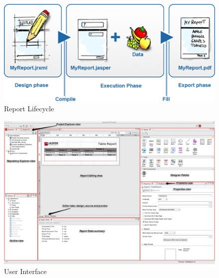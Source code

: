 \begin{figure}[!ht]
        \centering\includegraphics[width=\columnwidth]{../images/report-lifecycle.png}
        \caption{Report Lifecycle~\cite{hid-sp18-516-www-jaspersoft-studio}}
        \label{fig:report-lifecycle}
\end{figure}

\begin{figure}[!ht]
        \centering\includegraphics[width=\columnwidth]{../images/user-interface.jpg}
        \caption{User Interface~\cite{hid-sp18-516-www-jaspersoft-studio}}
        \label{fig:user-interface}
\end{figure}

